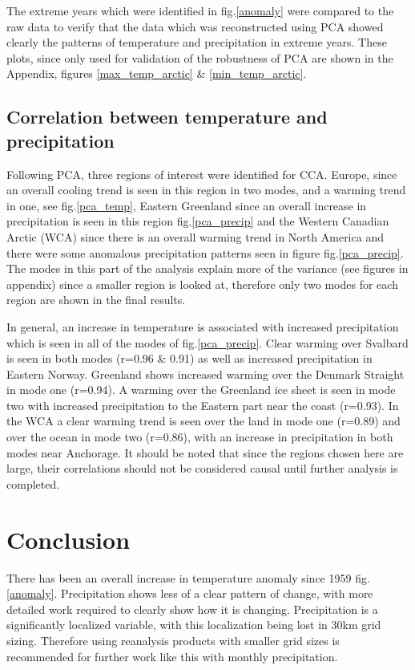 \documentclass[11pt, oneside]{article}
\begin{document}
        The extreme years which were identified in fig.\ref{anomaly} were compared to the raw data to verify that the data which was reconstructed using PCA showed clearly the patterns of temperature and precipitation in extreme years. These plots, since only used for validation of the robustness of PCA are shown in the Appendix, figures \ref{max_temp_arctic} \& \ref{min_temp_arctic}.


\subsection{Correlation between temperature and precipitation}
Following PCA, three regions of interest were identified for CCA. Europe, since an overall cooling trend is seen in this region in two modes, and a warming trend in one, see fig.\ref{pca_temp}, Eastern Greenland since an overall increase in precipitation is seen in this region fig.\ref{pca_precip} and the Western Canadian Arctic (WCA) since there is an overall warming trend in North America and there were some anomalous precipitation patterns seen in figure fig.\ref{pca_precip}. The modes in this part of the analysis explain more of the variance (see figures in appendix) since a smaller region is looked at, therefore only two modes for each region are shown in the final results.
 
In general, an increase in temperature is associated with increased precipitation \cite{box2019key} which is seen in all of the modes of fig.\ref{pca_precip}. Clear warming over Svalbard is seen in both modes (r=0.96 \& 0.91) as well as increased precipitation in Eastern Norway. Greenland shows increased warming over the Denmark Straight in mode one (r=0.94). A warming over the Greenland ice sheet is seen in mode two with increased precipitation to the Eastern part near the coast (r=0.93). In the WCA a clear warming trend is seen over the land in mode one (r=0.89) and over the ocean in mode two (r=0.86), with an increase in precipitation in both modes near Anchorage. It should be noted that since the regions chosen here are large, their correlations should not be considered causal until further analysis is completed.
 
 



\section{Conclusion}
There has been an overall increase in temperature anomaly since 1959 fig.\ref{anomaly}. Precipitation shows less of a clear pattern of change, with more detailed work required to clearly show how it is changing. Precipitation is a significantly localized variable, with this localization being lost in 30km grid sizing. Therefore using reanalysis products with smaller grid sizes is recommended for further work like this with monthly precipitation.
 
\end{document}
